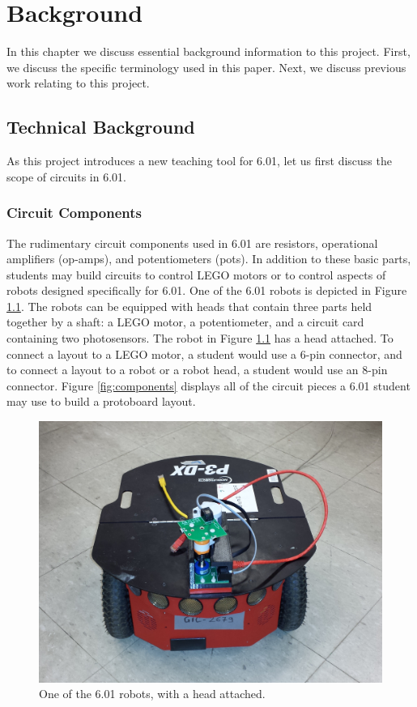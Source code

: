 
\chapter{Background}
\label{ch:background}

In this chapter we discuss essential background information to this project.
First, we discuss the specific terminology used in this paper. Next, we discuss
previous work relating to this project.

\section{Technical Background}

As this project introduces a new teaching tool for 6.01,
let us first discuss the scope of circuits in 6.01.

\subsection{Circuit Components}

The rudimentary circuit components used in 6.01 are resistors, operational
amplifiers (op-amps), and potentiometers (pots). In addition to these basic
parts, students may build circuits to control LEGO motors or to control
aspects of robots designed specifically for 6.01. One of the 6.01 robots is
depicted in Figure \ref{fig:robot}. The robots can be equipped with heads that
contain three parts held together by a shaft: a LEGO motor, a potentiometer, and
a circuit card containing two photosensors. The robot in Figure \ref{fig:robot}
has a
head attached. To connect a layout to a LEGO motor, a student would use a 6-pin
connector, and to connect a layout to a robot or a robot head, a student would
use an 8-pin connector. Figure \ref{fig:components} displays all of the circuit
pieces a 6.01 student may use to build a protoboard layout.

\begin{figure}
\begin{center}
\includegraphics[width=\textwidth]{Images/robot.jpeg}
\caption[6.01 robot]{One of the 6.01 robots, with a head attached.}
\label{fig:robot}
\end{center}
\end{figure}

